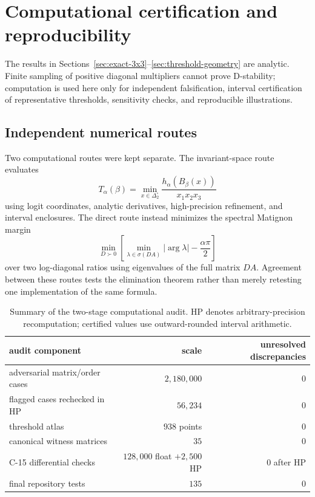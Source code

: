 \section{Computational certification and reproducibility}
\label{sec:computation}

The results in Sections~\ref{sec:exact-3x3}--\ref{sec:threshold-geometry} are analytic. Finite sampling of positive diagonal multipliers cannot prove D-stability; computation is used here only for independent falsification, interval certification of representative thresholds, sensitivity checks, and reproducible illustrations.

\subsection{Independent numerical routes}

Two computational routes were kept separate. The invariant-space route evaluates
\[
T_\alpha(\beta)
=
\min_{x\in\Delta_2^\circ}
\frac{h_\alpha(B_\beta(x))}{x_1x_2x_3}
\]
using logit coordinates, analytic derivatives, high-precision refinement, and interval enclosures. The direct route instead minimizes the spectral Matignon margin
\[
\min_{D\succ0}
\left[
\min_{\lambda\in\sigma(DA)}
|\arg\lambda|-\frac{\alpha\pi}{2}
\right]
\]
over two log-diagonal ratios using eigenvalues of the full matrix \(DA\). Agreement between these routes tests the elimination theorem rather than merely retesting one implementation of the same formula.

\begin{table}[t]
\centering
\small
\caption{Summary of the two-stage computational audit. HP denotes arbitrary-precision recomputation; certified values use outward-rounded interval arithmetic.}
\label{tab:compute-summary}
\begin{tabular}{lrr}
\toprule
audit component & scale & unresolved discrepancies\\
\midrule
adversarial matrix/order cases & \(2{,}180{,}000\) & 0\\
flagged cases rechecked in HP & \(56{,}234\) & 0\\
threshold atlas & \(938\) points & 0\\
canonical witness matrices & \(35\) & 0\\
C-15 differential checks & \(128{,}000\) float \(+2{,}500\) HP & 0 after HP\\
final repository tests & \(135\) & 0\\
\bottomrule
\end{tabular}
\end{table}

